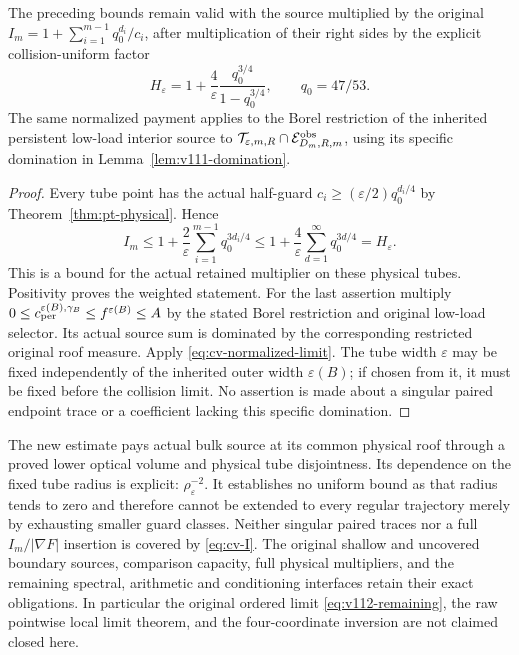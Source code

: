 \begin{corollary}
\label{cor:cv-incidence-persistent}
The preceding bounds remain valid with the source multiplied by
the original
$I_m=1+\sum_{i=1}^{m-1}q_0^{d_i}/c_i$, after multiplication of
their right sides by the explicit collision-uniform factor
\begin{equation}\label{eq:cv-I}
 H_\varepsilon=1+\frac4\varepsilon
                  \frac{q_0^{3/4}}{1-q_0^{3/4}},\qquad q_0=47/53.
\end{equation}
The same normalized payment applies to the Borel restriction of
the inherited persistent low-load interior source to
$\mathcal T_{\varepsilon,m,R}\cap\mathcal E^{\rm obs}_{D_m,R,m}$,
using its specific domination in Lemma~\ref{lem:v111-domination}.
\end{corollary}
\begin{proof}
Every tube point has the actual half-guard
$c_i\ge(\varepsilon/2)q_0^{d_i/4}$ by
Theorem~\ref{thm:pt-physical}.  Hence
\[
 I_m\le1+\frac2\varepsilon\sum_{i=1}^{m-1}q_0^{3d_i/4}
      \le1+\frac4\varepsilon
                    \sum_{d=1}^\infty q_0^{3d/4}=H_\varepsilon.
\]
This is a bound for the actual retained multiplier on these
physical tubes.  Positivity proves the weighted statement.
For the last assertion multiply
$0\le c_{\rm per}^{\varepsilon(B),\gamma_B}
       \le f^{\varepsilon(B)}\le A$
by the stated Borel restriction and original low-load selector.
Its actual source sum is dominated by the corresponding restricted
original roof measure.  Apply \eqref{eq:cv-normalized-limit}.
The tube width $\varepsilon$ may be fixed independently of the
inherited outer width $\varepsilon(B)$; if chosen from it, it must
be fixed before the collision limit.  No assertion is made about a
singular paired endpoint trace or a coefficient lacking this
specific domination.
\end{proof}

\begin{remark}
\label{rem:cv-scope}
The new estimate pays actual bulk source at its common physical
roof through a proved lower optical volume and physical tube
disjointness.  Its dependence on the fixed tube radius is explicit:
$\rho_\varepsilon^{-2}$.  It establishes no uniform bound as that
radius tends to zero and therefore cannot be extended to every
regular trajectory merely by exhausting smaller guard classes.
Neither singular paired traces nor a full $I_m/|\nabla F|$
insertion is covered by \eqref{eq:cv-I}.
The original shallow and uncovered boundary sources, comparison
capacity, full physical multipliers, and the remaining spectral,
arithmetic and conditioning interfaces retain their exact
obligations.  In particular the original ordered limit
\eqref{eq:v112-remaining}, the raw pointwise local limit theorem,
and the four-coordinate inversion are not claimed closed here.
\end{remark}
